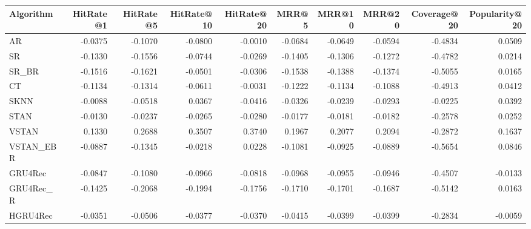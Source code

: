 \begin{tabular}{lrrrrrrrrr}
\toprule
 Algorithm &  HitRate@1 &  HitRate@5 &  HitRate@10 &  HitRate@20 &   MRR@5 &  MRR@10 &  MRR@20 &  Coverage@20 &  Popularity@20 \\
\midrule
        AR &    -0.0375 &    -0.1070 &     -0.0800 &     -0.0010 & -0.0684 & -0.0649 & -0.0594 &      -0.4834 &         0.0509 \\
        SR &    -0.1330 &    -0.1556 &     -0.0744 &     -0.0269 & -0.1405 & -0.1306 & -0.1272 &      -0.4782 &         0.0214 \\
     SR\_BR &    -0.1516 &    -0.1621 &     -0.0501 &     -0.0306 & -0.1538 & -0.1388 & -0.1374 &      -0.5055 &         0.0165 \\
        CT &    -0.1134 &    -0.1314 &     -0.0611 &     -0.0031 & -0.1222 & -0.1134 & -0.1088 &      -0.4913 &         0.0412 \\
      SKNN &    -0.0088 &    -0.0518 &      0.0367 &     -0.0416 & -0.0326 & -0.0239 & -0.0293 &      -0.0225 &         0.0392 \\
      STAN &    -0.0130 &    -0.0237 &     -0.0265 &     -0.0280 & -0.0177 & -0.0181 & -0.0182 &      -0.2578 &         0.0252 \\
     VSTAN &     0.1330 &     0.2688 &      0.3507 &      0.3740 &  0.1967 &  0.2077 &  0.2094 &      -0.2872 &         0.1637 \\
 VSTAN\_EBR &    -0.0887 &    -0.1345 &     -0.0218 &      0.0228 & -0.1081 & -0.0925 & -0.0889 &      -0.5654 &         0.0846 \\
   GRU4Rec &    -0.0847 &    -0.1080 &     -0.0966 &     -0.0818 & -0.0968 & -0.0955 & -0.0946 &      -0.4507 &        -0.0133 \\
 GRU4Rec\_R &    -0.1425 &    -0.2068 &     -0.1994 &     -0.1756 & -0.1710 & -0.1701 & -0.1687 &      -0.5142 &         0.0163 \\
  HGRU4Rec &    -0.0351 &    -0.0506 &     -0.0377 &     -0.0370 & -0.0415 & -0.0399 & -0.0399 &      -0.2834 &        -0.0059 \\
\bottomrule
\end{tabular}
